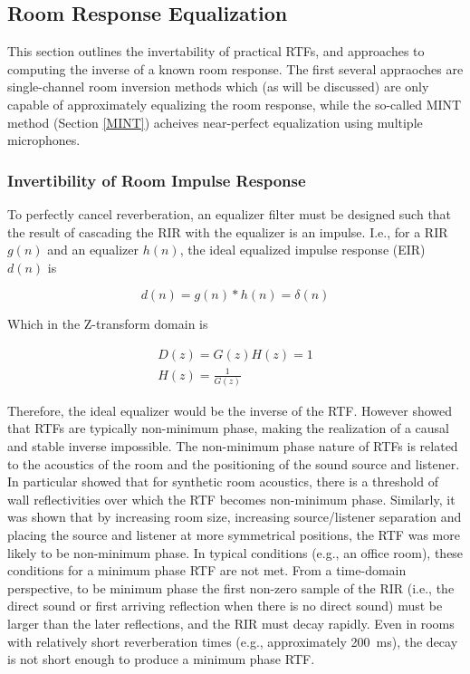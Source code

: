 \subsection{Room Response Equalization}

This section outlines the invertability of practical RTFs, and approaches to computing the inverse of a known room response. The first several appraoches are single-channel room inversion methods which (as will be discussed) are only capable of approximately equalizing the room response, while the so-called MINT method (Section \ref{MINT}) acheives near-perfect equalization using multiple microphones.

\subsubsection{Invertibility of Room Impulse Response} \label{RIR_Invertibility}

To perfectly cancel reverberation, an equalizer filter must be designed such that the result of cascading the RIR with the equalizer is an impulse. I.e., for a RIR $g(n)$ and an equalizer $h(n)$, the ideal equalized impulse response (EIR) $d(n)$  is

\begin{equation} 
d(n)=g(n)*h(n)=\delta(n)
\end{equation}

\noindent
Which in the Z-transform domain is

\begin{eqnarray}
D(z)=G(z)H(z)=1	\\
H(z)=\frac{1}{G(z)}
\end{eqnarray}

Therefore, the ideal equalizer would be the inverse of the RTF. However \cite{neely1979invertibility} showed that RTFs are typically non-minimum phase, making the realization of a causal and stable inverse impossible. The non-minimum phase nature of RTFs is related to the acoustics of the room and the positioning of the sound source and listener. In particular \cite{neely1979invertibility} showed that for synthetic room acoustics, there is a threshold of wall reflectivities over which the RTF becomes non-minimum phase. Similarly, it was shown that by increasing room size, increasing source/listener separation and placing the source and listener at more symmetrical positions, the RTF was more likely to be non-minimum phase. In typical conditions (e.g., an office room), these conditions for a minimum phase RTF are not met. From a time-domain perspective, to be minimum phase the first non-zero sample of the RIR (i.e., the direct sound or first arriving reflection when there is no direct sound) must be larger than the later reflections, and the RIR must decay rapidly. Even in rooms with relatively short reverberation times (e.g., approximately \qty{200}{\milli\second}), the decay is not short enough to produce a minimum phase RTF.

